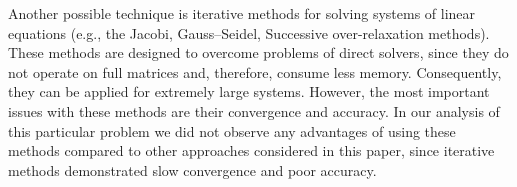 Another possible technique is iterative methods for solving systems of linear equations (e.g., the Jacobi, Gauss–Seidel, Successive over-relaxation methods). These methods are designed to overcome problems of direct solvers, since they do not operate on full matrices and, therefore, consume less memory. Consequently, they can be applied for extremely large systems. However, the most important issues with these methods are their convergence and accuracy. In our analysis of this particular problem we did not observe any advantages of using these methods compared to other approaches considered in this paper, since iterative methods demonstrated slow convergence and poor accuracy.
